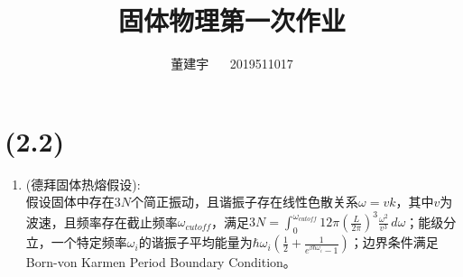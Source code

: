 \documentclass[reqno,a4paper,12pt]{amsart}
\title{固体物理第一次作业}
\author{董建宇 ~~ 2019511017}
\begin{document}
\maketitle
\titleformat{\section}[hang]{\small}{\thesection}{0.8em}{}{}
\titleformat{\subsection}[hang]{\small}{\thesubsection}{0.8em}{}{}


\section{(2.2)}
\begin{enumerate}
	\item (德拜固体热熔假设): \\
	假设固体中存在$3N$个简正振动，且谐振子存在线性色散关系$\omega = v k$，其中$v$为波速，且频率存在截止频率$\omega_{cutoff}$，满足$3N = \int_0^{\omega_{cutoff}} 12\pi \left( \frac{L}{2\pi} \right)^3 \frac{\omega^2}{v^3}\,d\omega$；能级分立，一个特定频率$\omega_i$的谐振子平均能量为$\hbar\omega_i\left( \frac{1}{2} + \frac{1}{e^{\beta\hbar\omega_i} - 1} \right)$；边界条件满足Born-von Karmen Period Boundary Condition。 \\
	

\end{enumerate}
\end{document}
